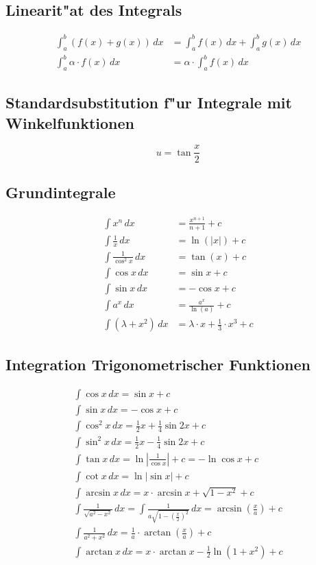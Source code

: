 \subsection{Linearit"at des Integrals}
\begin{align}
\int_a^b \left(f(x)+g(x)\right)\,dx &= \int_a^b f(x)\,dx + \int_a^b g(x)\,dx \\
\int_a^b \alpha\cdot f(x)\,dx &= \alpha\cdot\int_a^b f(x)\,dx
\end{align}


\subsection{Standardsubstitution f"ur Integrale mit Winkelfunktionen}
\begin{equation}
u = \tan{\frac{x}{2}}
\end{equation}


\subsection{Grundintegrale}
\begin{align}
  \int x^n\,dx &= \frac{x^{n+1}}{n+1}+c \\
  \int \frac{1}{x}\,dx &= \ln\left(|x|\right)+c \\
  \int \frac{1}{\cos^2{x}}\,dx &= \tan(x)+c \\
  \int \cos{x}\,dx &= \sin{x}+c \\
  \int \sin{x}\,dx &= -\cos{x}+c \\
  \int a^x\,dx &= \frac{a^x}{\ln(a)}+c \\
  \int \left(\lambda + x^2\right)\,dx &= \lambda \cdot x + \frac{1}{3}\cdot x^3 + c
\end{align}


\subsection{Integration Trigonometrischer Funktionen}
\begin{gather}
  \int\cos{x}\,dx = \sin{x}+c \\
  \int\sin{x}\,dx = -\cos{x}+c \\
  \int\cos^2{x}\,dx = \frac{1}{2}x+\frac{1}{4}\sin{2x}+c \\
  \int\sin^2{x}\,dx = \frac{1}{2}x-\frac{1}{4}\sin{2x}+c \\
  \int\tan{x}\,dx = \ln{\left|{\frac{1}{\cos{x}}}\right|}+c = -\ln{\cos{x}}+c \\
  \int\cot{x}\,dx = \ln{\left|{\sin{x}}\right|}+c \\
  \int\arcsin{x}\,dx = x\cdot \arcsin{x}+\sqrt{1-x^2}+c \\
  \int\frac{1}{\sqrt{a^2-x^2}}\,dx = \int\frac{1}{a\sqrt{1-{\left({\frac{x}{2}}\right)}^2}}\,dx = \arcsin{\left({\frac{x}{a}}\right)}+c \\
  \int\frac{1}{a^2+x^2}\,dx = \frac{1}{a}\cdot\arctan{\left({\frac{x}{a}}\right)}+c \\
  \int\arctan{x}\,dx = x\cdot\arctan{x}-\frac{1}{2}\ln{\left({1+x^2}\right)}+c
\end{gather}


